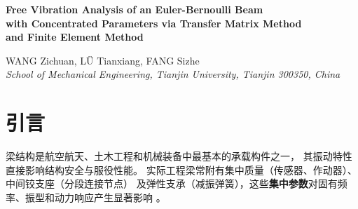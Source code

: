 \documentclass[twoside,12pt]{ctexart}
\newcommand{\betan}{\beta_n}
\begin{document}
\newpage
\begin{center}\large\textbf{Free Vibration Analysis of an Euler-Bernoulli Beam\\
with Concentrated Parameters via Transfer Matrix Method\\
and Finite Element Method}\end{center}
\vspace{1ex}
\begin{center}
WANG Zichuan, L\"U Tianxiang, FANG Sizhe\\
\textit{School of Mechanical Engineering, Tianjin University, Tianjin 300350, China}
\end{center}
\vspace{1ex}
\begin{abstract}
\noindent
A comparative study of free transverse vibration of a multi-point concentrated-parameter
Euler-Bernoulli beam is presented using the Transfer Matrix Method (TMM) and Finite Element
Method (FEM). The TMM constructs state-vector transfer matrices from beam-segment general
solutions and introduces jump matrices at concentrated parameters, reducing the frequency
equation to $\det\mathbf{A}(\beta)=0$. The FEM employs two-node Hermite beam elements
(40 elements, 81 active DOFs) and solves the generalized eigenvalue problem via Cholesky
decomposition. Results show natural frequency errors $<0.002\%$, mode shape discrepancy
$<5\times10^{-6}$, and cumulative response error $<0.02\;\mu\text{m}$. The linear
correlation of $\betan$ yields $R^2>0.99999999$. FEM achieves machine-precision
orthogonality ($10^{-15}$). The two methods provide mutual verification and a complete
accuracy benchmark.

\vspace{1ex}
\noindent\textbf{Keywords:} Euler-Bernoulli beam; transfer matrix method;
finite element method; free vibration; concentrated parameters; modal analysis
\end{abstract}

\newpage
\section{引言}

梁结构是航空航天、土木工程和机械装备中最基本的承载构件之一，
其振动特性直接影响结构安全与服役性能。
实际工程梁常附有集中质量（传感器、作动器）、中间铰支座（分段连接节点）
及弹性支承（减振弹簧），这些\textbf{集中参数}对固有频率、振型和动力响应产生显著影响
\cite{timoshenko1937,meirovitch1967,clough2003}。
\end{document}
